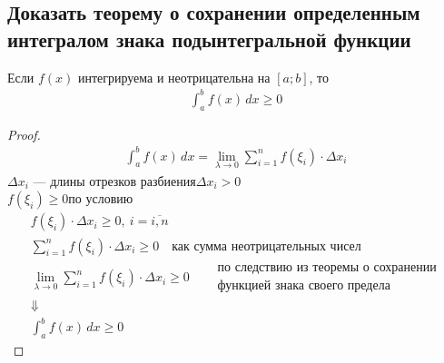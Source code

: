 \subsection{Доказать теорему о сохранении определенным интегралом знака подынтегральной функции}
\setcounter{theorem}{6}
\begin{theorem}
    Если $f(x)$ интегрируема и неотрицательна на $[a;b]$, то 
    \begin{gather*}
        \boxed{\int_{a}^{b} f(x)\, dx \geqslant 0}
    \end{gather*}
\end{theorem}
\begin{proof}
    \phantom{a} \vspace{-2\topsep}
    \begin{gather*}
        \int_{a}^{b} f(x)\, dx = \lim_{\lambda\to 0} \sum_{i=1}^{n} f(\xi_i)\cdot \Delta x_i
    \end{gather*}
    $\Delta x_i$ --- длины отрезков разбиения\qquad $\Delta x_i > 0$ \\
    $f(\xi_i) \geqslant 0$\quad по условию
    \begin{gather*}
        f(\xi_i)\cdot \Delta x_i \geqslant 0,\ i = \overline{i, n}\\
        \sum_{i=1}^{n} f(\xi_i)\cdot \Delta x_i \geqslant 0\quad \text{как сумма неотрицательных чисел}\\
        \lim_{\lambda \to 0} \sum_{i=1}^{n} f(\xi_i) \cdot \Delta x_i \geqslant 0\quad \begin{aligned} &\text{по следствию из теоремы } \textit{о сохранении} \\ &\textit{функцией знака своего предела} \end{aligned}\\
        \Downarrow\\
        \int_{a}^{b} f(x)\, dx \geqslant 0
    \end{gather*}
\end{proof}

\newpage
